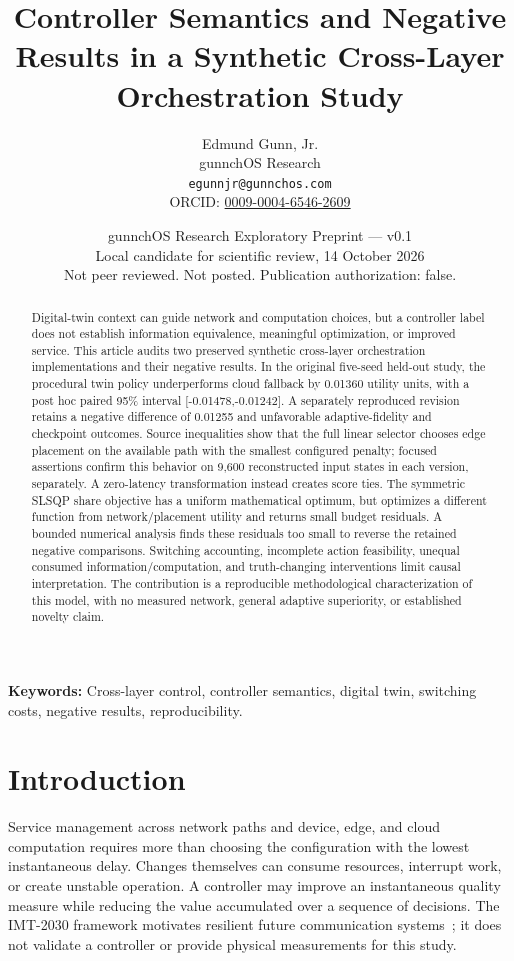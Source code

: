 \documentclass[10pt,twocolumn]{article}
\title{Controller Semantics and Negative Results in a Synthetic Cross-Layer Orchestration Study}
\author{Edmund Gunn, Jr.\\gunnchOS Research\\\texttt{egunnjr@gunnchos.com}\\ORCID: \href{https://orcid.org/0009-0004-6546-2609}{0009-0004-6546-2609}}
\date{gunnchOS Research Exploratory Preprint --- v0.1\\Local candidate for scientific review, 14 October 2026\\Not peer reviewed. Not posted. Publication authorization: false.}
\begin{document}
\maketitle
\begin{abstract}
Digital-twin context can guide network and computation choices, but a controller label does not establish information equivalence, meaningful optimization, or improved service. This article audits two preserved synthetic cross-layer orchestration implementations and their negative results. In the original five-seed held-out study, the procedural twin policy underperforms cloud fallback by 0.01360 utility units, with a post hoc paired 95\% interval [-0.01478,-0.01242]. A separately reproduced revision retains a negative difference of 0.01255 and unfavorable adaptive-fidelity and checkpoint outcomes. Source inequalities show that the full linear selector chooses edge placement on the available path with the smallest configured penalty; focused assertions confirm this behavior on 9,600 reconstructed input states in each version, separately. A zero-latency transformation instead creates score ties. The symmetric SLSQP share objective has a uniform mathematical optimum, but optimizes a different function from network/placement utility and returns small budget residuals. A bounded numerical analysis finds these residuals too small to reverse the retained negative comparisons. Switching accounting, incomplete action feasibility, unequal consumed information/computation, and truth-changing interventions limit causal interpretation. The contribution is a reproducible methodological characterization of this model, with no measured network, general adaptive superiority, or established novelty claim.
\end{abstract}
\noindent\textbf{Keywords:} Cross-layer control, controller semantics, digital twin, switching costs, negative results, reproducibility.

\section{Introduction}
Service management across network paths and device, edge, and cloud computation requires more than choosing the configuration with the lowest instantaneous delay. Changes themselves can consume resources, interrupt work, or create unstable operation. A controller may improve an instantaneous quality measure while reducing the value accumulated over a sequence of decisions. The IMT-2030 framework motivates resilient future communication systems~\cite{itur2023framework}; it does not validate a controller or provide physical measurements for this study.
\end{document}

